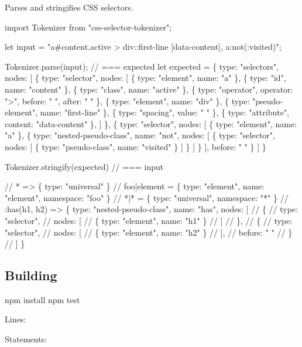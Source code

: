 Parses and stringifies C\+SS selectors.


\begin{DoxyCode}
import Tokenizer from "css-selector-tokenizer";

let input = "a#content.active > div::first-line [data-content], a:not(:visited)";

Tokenizer.parse(input); // === expected
let expected = \{
  type: "selectors",
  nodes: [
    \{
      type: "selector",
      nodes: [
        \{ type: "element", name: "a" \},
        \{ type: "id", name: "content" \},
        \{ type: "class", name: "active" \},
        \{ type: "operator", operator: ">", before: " ", after: " " \},
        \{ type: "element", name: "div" \},
        \{ type: "pseudo-element", name: "first-line" \},
        \{ type: "spacing", value: " " \},
        \{ type: "attribute", content: "data-content" \},
      ]
    \},
    \{
      type: "selector",
      nodes: [
        \{ type: "element", name: "a" \},
        \{ type: "nested-pseudo-class", name: "not", nodes: [
          \{
            type: "selector",
            nodes: [
              \{ type: "pseudo-class", name: "visited" \}
            ]
          \}
        ] \}
      ],
      before: " "
    \}
  ]
\}

Tokenizer.stringify(expected) // === input

// * => \{ type: "universal" \}
// foo|element = \{ type: "element", name: "element", namespace: "foo" \}
// *|* = \{ type: "universal", namespace: "*" \}
// :has(h1, h2) => \{ type: "nested-pseudo-class", name: "has", nodes: [
//     \{
//       type: "selector",
//       nodes: [
//         \{ type: "element", name: "h1" \}
//       ]
//     \},
//     \{
//       type: "selector",
//       nodes: [
//         \{ type: "element", name: "h2" \}
//       ],
//       before: " "
//     \}
//   ] \}
\end{DoxyCode}


\subsection*{Building}


\begin{DoxyCode}
npm install
npm test
\end{DoxyCode}


\href{https://travis-ci.org/css-modules/css-selector-tokenizer}{\tt }


\begin{DoxyItemize}
\item Lines\+: \href{https://coveralls.io/r/css-modules/css-selector-tokenizer?branch=master}{\tt }
\item Statements\+: \href{http://codecov.io/github/css-modules/css-selector-tokenizer?branch=master}{\tt }
\end{DoxyItemize}

